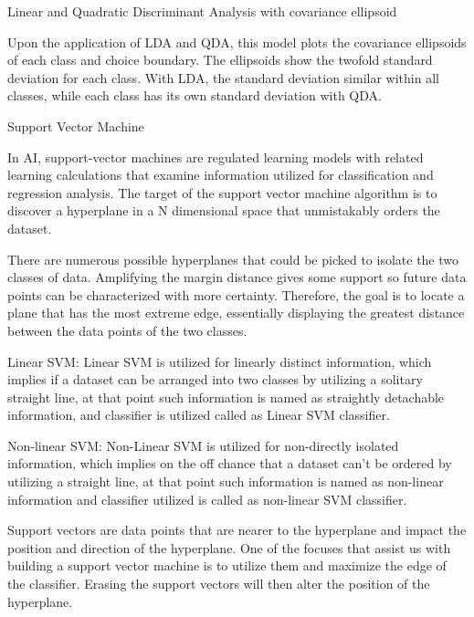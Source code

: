 \documentclass[a4paper,12pt]{report}
\begin{document}
Linear and Quadratic Discriminant Analysis with covariance ellipsoid




Upon the application of LDA and QDA, this model plots the covariance ellipsoids of each class and choice boundary. The ellipsoids show the twofold standard deviation for each class. With LDA, the standard deviation similar within all classes, while each class has its own standard deviation with QDA.

Support Vector Machine
 
In AI, support-vector machines are regulated learning models with related learning calculations that examine information utilized for classification and regression analysis. The target of the support vector machine algorithm is to discover a hyperplane in a N dimensional space that unmistakably orders the dataset.


There are numerous possible hyperplanes that could be picked to isolate the two classes of data. Amplifying the margin distance gives some support so future data points can be characterized with more certainty. Therefore, the goal is to locate a plane that has the most extreme edge, essentially displaying the greatest distance between the data points of the two classes.








Linear SVM: Linear SVM is utilized for linearly distinct information, which implies if a dataset can be arranged into two classes by utilizing a solitary straight line, at that point such information is named as straightly detachable information, and classifier is utilized called as Linear SVM classifier.



Non-linear SVM: Non-Linear SVM is utilized for non-directly isolated information, which implies on the off chance that a dataset can't be ordered by utilizing a straight line, at that point such information is named as non-linear information and classifier utilized is called as non-linear SVM classifier.






Support vectors are data points that are nearer to the hyperplane and impact the position and direction of the hyperplane. One of the focuses that assist us with building a support vector machine is to utilize them and maximize the edge of the classifier. Erasing the support vectors will then alter the position of the hyperplane.
\end{document}
